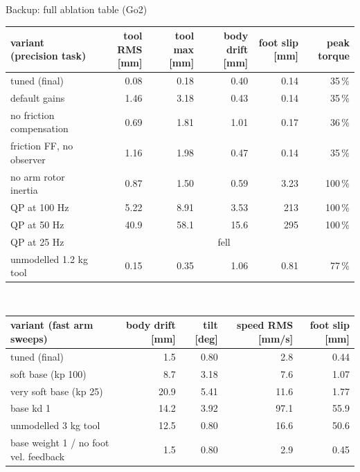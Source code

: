 \documentclass[aspectratio=169,10pt]{beamer}
\begin{document}
\begin{frame}{Backup: full ablation table (Go2)}
\scriptsize\centering
\begin{tabular}{@{}lrrrrr@{}}\toprule
variant (precision task) & tool RMS [mm] & tool max [mm] & body drift [mm] & foot slip [mm] & peak torque\\\midrule
tuned (final) & 0.08 & 0.18 & 0.40 & 0.14 & 35\,\%\\
default gains & 1.46 & 3.18 & 0.43 & 0.14 & 35\,\%\\
no friction compensation & 0.69 & 1.81 & 1.01 & 0.17 & 36\,\%\\
friction FF, no observer & 1.16 & 1.98 & 0.47 & 0.14 & 35\,\%\\
no arm rotor inertia & 0.87 & 1.50 & 0.59 & 3.23 & 100\,\%\\
QP at 100 Hz & 5.22 & 8.91 & 3.53 & 213 & 100\,\%\\
QP at 50 Hz & 40.9 & 58.1 & 15.6 & 295 & 100\,\%\\
QP at 25 Hz & \multicolumn{5}{c}{fell}\\
unmodelled 1.2 kg tool & 0.15 & 0.35 & 1.06 & 0.81 & 77\,\%\\\bottomrule
\end{tabular}\\[8pt]
\begin{tabular}{@{}lrrrr@{}}\toprule
variant (fast arm sweeps) & body drift [mm] & tilt [deg] & speed RMS [mm/s] & foot slip [mm]\\\midrule
tuned (final) & 1.5 & 0.80 & 2.8 & 0.44\\
soft base (kp 100) & 8.7 & 3.18 & 7.6 & 1.07\\
very soft base (kp 25) & 20.9 & 5.41 & 11.6 & 1.77\\
base kd 1 & 14.2 & 3.92 & 97.1 & 55.9\\
unmodelled 3 kg tool & 12.5 & 0.80 & 16.6 & 50.6\\
base weight 1 / no foot vel. feedback & 1.5 & 0.80 & 2.9 & 0.45\\\bottomrule
\end{tabular}
\end{frame}
\end{document}

